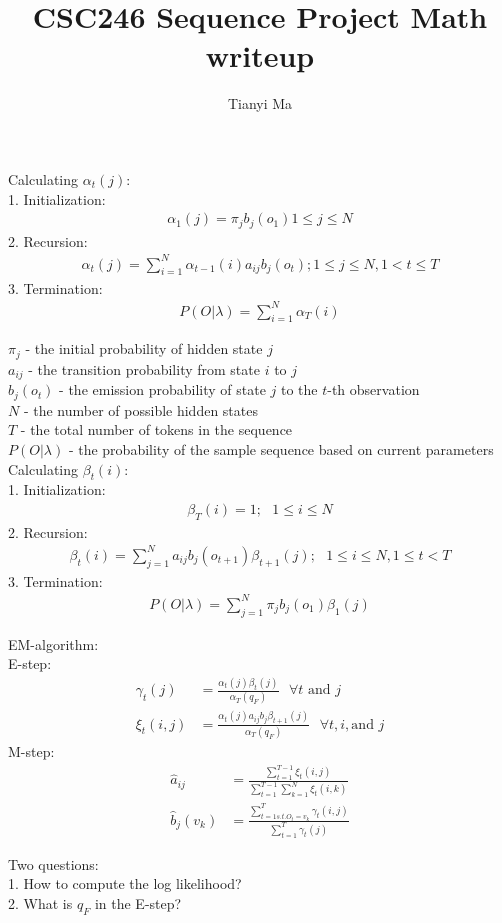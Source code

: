 \documentclass[12pt]{article}
\begin{document}
\title{CSC246 Sequence Project Math writeup}
\author{Tianyi Ma}
\maketitle

Calculating $\alpha_t(j)$:\\
1. Initialization:
\begin{align*}
\alpha_1(j) = \pi_jb_j(o_1) 1 \leq j \leq N
\end{align*}
2. Recursion:
\begin{align*}
\alpha_t(j) = \sum_{i=1}^N \alpha_{t-1}(i)a_{ij}b_j(o_t); 1 \leq j \leq N, 1 < t \leq T
\end{align*}
3. Termination:
\begin{align*}
P(O|\lambda) = \sum_{i=1}^N \alpha_T(i)
\end{align*}

$\pi_j$ - the initial probability of hidden state $j$\\
$a_{ij}$ - the transition probability from state $i$ to $j$\\
$b_j(o_t)$ - the emission probability of state $j$ to the $t$-th observation\\
$N$ - the number of possible hidden states\\
$T$ - the total number of tokens in the sequence\\
$P(O|\lambda)$ - the probability of the sample sequence based on current parameters\\

Calculating $\beta_t(i)$:\\
1. Initialization:
\begin{align*}
\beta_T(i) = 1; \text{    } 1 \leq i \leq N
\end{align*}
2. Recursion:
\begin{align*}
\beta_t(i) = \sum_{j=1}^N a_{ij}b_j(o_{t+1})\beta_{t+1}(j); \text{    } 1 \leq i \leq N, 1 \leq t < T
\end{align*}
3. Termination:
\begin{align*}
P(O|\lambda) = \sum_{j=1}^N \pi_jb_j(o_1)\beta_1(j)
\end{align*}

EM-algorithm:\\
E-step:
\begin{align*}
\gamma_t(j) &= \frac{\alpha_t(j)\beta_t(j)}{\alpha_T(q_F)}  \text{    } \forall t \text{ and } j\\
\xi_t(i,j) &= \frac{\alpha_t(j)a_{ij}b_j\beta_{t+1}(j)}{\alpha_T(q_F)}  \text{    } \forall t, i,\text{and } j
\end{align*}
M-step:
\begin{align*}
\hat{a}_{ij} &= \frac{\sum_{t=1}^{T-1}\xi_t(i,j)}{\sum_{t=1}^{T-1}\sum_{k=1}^N\xi_t(i,k)}\\
\hat{b}_j(v_k) &= \frac{\sum_{t=1 s.t. O_t = v_k}^T \gamma_t(i,j)}{\sum_{t=1}^T\gamma_t(j)}
\end{align*}

Two questions:\\
1. How to compute the log likelihood?\\
2. What is $q_F$ in the E-step?
\end{document}
